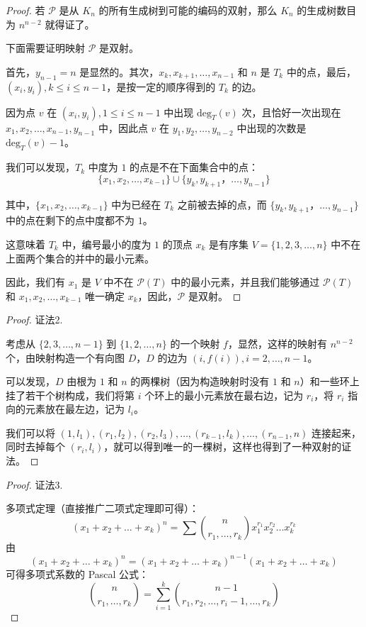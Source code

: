 \documentclass[cn,hazy,sakura,14pt,normal]{elegantnote}
\begin{document}
\begin{sloppypar}
\begin{proof}
    若 $\mathcal{P}$ 是从 $K_n$ 的所有生成树到可能的编码的双射，那么 $K_n$ 的生成树数目为 $n ^ {n - 2}$ 就得证了。

    下面需要证明映射 $\mathcal{P}$ 是双射。

    首先，$y_{n - 1} = n$ 是显然的。其次，$x_k, x_{k + 1}, \dots, x_{n - 1}$ 和 $n$ 是 $T_k$ 中的点，最后，$(x_i, y_i), k \leq i \leq n - 1$，是按一定的顺序得到的 $T_k$ 的边。

    因为点 $v$ 在 $(x_i, y_i),1 \leq i \leq n - 1$ 中出现 $\text{deg}_{T}(v)$ 次，且恰好一次出现在 $x_1, x_2, \dots, x_{n - 1}, y_{n - 1}$ 中，因此点 $v$ 在 $y_1, y_2, \dots, y_{n - 2}$ 中出现的次数是 $\text{deg}_{T}(v) - 1$。

    我们可以发现，$T_k$ 中度为 $1$ 的点是不在下面集合中的点：
    $$\{x_1, x_2, \dots, x_{k - 1}\} \cup \{y_k, y_{k + 1}， \dots, y_{n - 1}\}$$

    其中，$\{x_1, x_2, \dots, x_{k - 1}\}$ 中为已经在 $T_k$ 之前被去掉的点，而 $\{y_k, y_{k + 1}，\dots, y_{n - 1}\}$ 中的点在剩下的点中度都不为 $1$。

    这意味着 $T_k$ 中，编号最小的度为 $1$ 的顶点 $x_k$ 是有序集 $V = \{1, 2, 3, \dots, n\}$ 中不在上面两个集合的并中的最小元素。

    因此，我们有 $x_1$ 是 $V$ 中不在 $\mathcal{P}(T)$ 中的最小元素，并且我们能够通过 $\mathcal{P}(T)$ 和 $x_1, x_2, \dots, x_{k - 1}$ 唯一确定 $x_k$，因此，$\mathcal{P}$ 是双射。
\end{proof}

\begin{proof}
    证法2.
    
    考虑从 $\{2, 3, \dots, n - 1\}$ 到 $\{1, 2, \dots, n\}$ 的一个映射 $f$，显然，这样的映射有 $n^{n - 2}$ 个，由映射构造一个有向图 $D$，$D$ 的边为 $(i, f(i)), i = 2, \dots, n - 1$。

    可以发现，$D$ 由根为 $1$ 和 $n$ 的两棵树（因为构造映射时没有 $1$ 和 $n$）和一些环上挂了若干个树构成，我们将第 $i$ 个环上的最小元素放在最右边，记为 $r_i$，将 $r_i$ 指向的元素放在最左边，记为 $l_i$。

    我们可以将 $(1, l_1), (r_1, l_2), (r_2, l_3), \dots, (r_{k - 1}, l_k), \dots, (r_{n - 1}, n)$ 连接起来，同时去掉每个 $(r_i, l_i)$，就可以得到唯一的一棵树，这样也得到了一种双射的证法。
\end{proof}

\begin{proof}
    证法3.

    多项式定理（直接推广二项式定理即可得）：
    $$(x_1 + x_2 + \dots + x_k)^n = \sum \binom{n}{r_1, \dots, r_k} x_1^{r_1}x_2^{r_2} \dots x_k^{r_k}$$
    由
    $$(x_1 + x_2 + \dots + x_k)^n = (x_1 + x_2 + \dots + x_k)^{n - 1} (x_1 + x_2 + \dots + x_k)$$
    可得多项式系数的 Pascal 公式：
    $$\binom{n}{r_1, \dots, r_k} = \sum_{i = 1}^{k} \binom{n - 1}{r_1, r_2, \dots, r_i - 1, \dots, r_k}$$
    

\end{proof}
\end{sloppypar}
\end{document}
